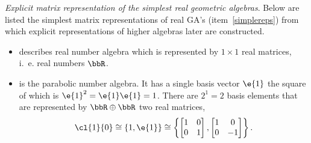 \begin{unit}\textit{Explicit matrix representation of the simplest real geometric algebras\label{GAreps}}.
Below are listed the simplest matrix representations of real GA's
(item~\ref{simplereps}) from which explicit representations of
higher algebras  later are constructed.
\begin{itemize}
\item[\cl{0}{0}] describes real number  algebra which is
represented by $1\times 1$ real matrices, i.~e. real numbers
$\bbR$.

\item[\cl{1}{0}] is the parabolic number algebra. It has a single
basis vector $\e{1}$ the square of which is
$\e{1}^2=\e{1}\e{1}=1$. There are $2^1=2$ basis elements that are
represented by $\bbR\oplus\bbR$ two real matrices,
\[\cl{1}{0}\cong\{1,\e{1}\}\cong\left\{
\begin{bmatrix}1&0\\0&1\end{bmatrix},
\begin{bmatrix}1&0\\0&-1\end{bmatrix}
\right\}.\]


\end{itemize}
\end{unit}
